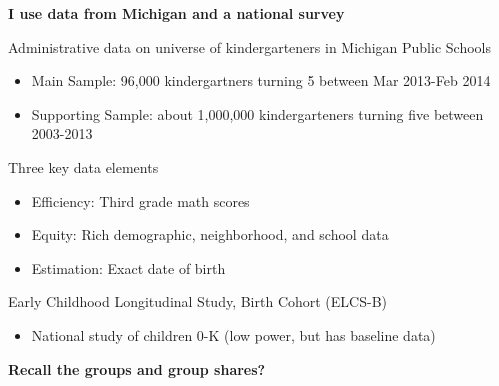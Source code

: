 \documentclass[t,aspectratio=169,11pt,presentation]{beamer}
\newenvironment{wideitemize}{\itemize\addtolength{\itemsep}{14pt}}{\enditemize}
\begin{document}
\begin{frame}{\textbf{I use data from Michigan and a national survey}}


\begin{wideitemize}
    \item Administrative data on universe of kindergarteners in Michigan Public Schools
    \begin{itemize}
        \item Main Sample: 96,000 kindergartners turning 5 between Mar 2013-Feb 2014
        \item Supporting Sample: about 1,000,000 kindergarteners turning five between 2003-2013
        
    \end{itemize}
    \item<2-> Three key data elements
    \begin{itemize}
        \item Efficiency: Third grade math scores 
        \item Equity: Rich demographic, neighborhood, and school data
        \item Estimation: Exact date of birth 
        
        
    
    \end{itemize}
    \item<3-> Early Childhood Longitudinal Study, Birth Cohort (ELCS-B)
    \begin{itemize}
        \item National study of children 0-K (low power, but has baseline data)
    \end{itemize}
\end{wideitemize}
\end{frame}


\begin{frame}[c]{\textbf{Recall the groups and group shares?}}
\begin{figure}
    \centering
    \begin{scaletikzpicturetowidth}{\textwidth}
    
    \end{scaletikzpicturetowidth}
\end{figure}
\end{frame}
\end{document}
